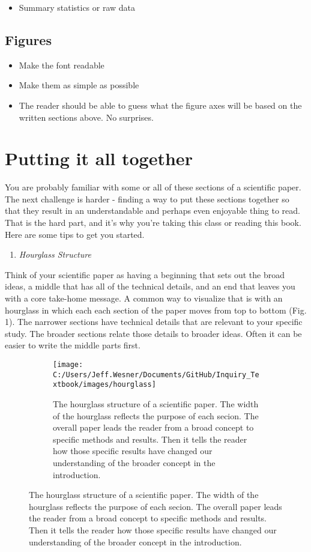 \documentclass[
]{article}
\providecommand{\tightlist}{%
  \setlength{\itemsep}{0pt}\setlength{\parskip}{0pt}}
\begin{document}
\begin{itemize}
\tightlist
\item
  Summary statistics or raw data
\end{itemize}

\hypertarget{figures}{%
\subsection{Figures}\label{figures}}

\begin{itemize}
\tightlist
\item
  Make the font readable
\item
  Make them as simple as possible
\item
  The reader should be able to guess what the figure axes will be based
  on the written sections above. No surprises.
\end{itemize}

\hypertarget{putting-it-all-together}{%
\section{Putting it all together}\label{putting-it-all-together}}

You are probably familiar with some or all of these sections of a
scientific paper. The next challenge is harder - finding a way to put
these sections together so that they result in an understandable and
perhaps even enjoyable thing to read. That is the hard part, and it's
why you're taking this class or reading this book. Here are some tips to
get you started.

\begin{enumerate}
\def\labelenumi{\arabic{enumi})}
\tightlist
\item
  \emph{Hourglass Structure}
\end{enumerate}

Think of your scientific paper as having a beginning that sets out the
broad ideas, a middle that has all of the technical details, and an end
that leaves you with a core take-home message. A common way to visualize
that is with an hourglass in which each each section of the paper moves
from top to bottom (Fig. 1). The narrower sections have technical
details that are relevant to your specific study. The broader sections
relate those details to broader ideas. Often it can be easier to write
the middle parts first.

\begin{figure}

\begin{figure}
\texttt{[image: C:/Users/Jeff.Wesner/Documents/GitHub/Inquiry\_Textbook/images/hourglass]} \caption{The hourglass structure of a scientific paper. The width of the hourglass reflects the purpose of each secion. The overall paper leads the reader from a broad concept to specific methods and results. Then it tells the reader how those specific results have changed our understanding of the broader concept in the introduction.}\label{fig:unnamed-chunk-1}
\end{figure}

\end{figure}
\end{document}
